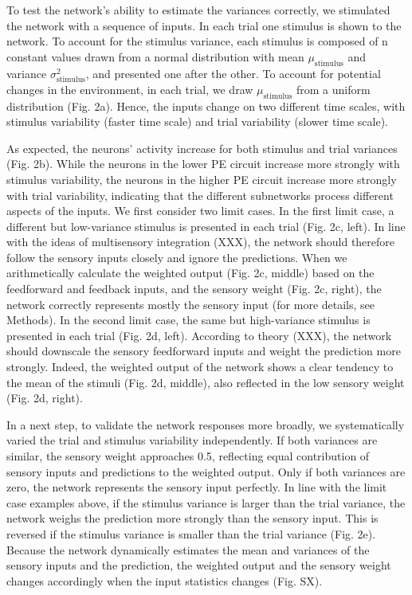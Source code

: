 \documentclass[10pt,a4paper,draft]{article}
\begin{document}
To test the network's ability to estimate the variances correctly, we stimulated the network with a sequence of inputs. In each trial one stimulus is shown to the network. To account for the stimulus variance, each stimulus is composed of n constant values drawn from a normal distribution with mean $\mu_\mathrm{stimulus}$ and variance $\sigma_\mathrm{stimulus}^2$, and presented one after the other. To account for potential changes in the environment, in each trial, we draw $\mu_\mathrm{stimulus}$ from a uniform distribution (Fig. 2a). Hence, the inputs change on two different time scales, with stimulus variability (faster time scale) and trial variability (slower time scale).

As expected, the neurons' activity increase for both stimulus and trial variances (Fig. 2b). While the neurons in the lower PE circuit increase more strongly with stimulus variability, the neurons in the higher PE circuit increase more strongly with trial variability, indicating that the different subnetworks process different aspects of the inputs. We first consider two limit cases. In the first limit case, a different but low-variance stimulus is presented in each trial (Fig. 2c, left). In line with the ideas of multisensory integration (XXX), the network should therefore follow the sensory inputs closely and ignore the predictions. When we arithmetically calculate the weighted output (Fig. 2c, middle) based on the feedforward and feedback inputs, and the sensory weight (Fig. 2c, right), the network correctly represents mostly the sensory input (for more details, see Methods). In the second limit case, the same but high-variance stimulus is presented in each trial (Fig. 2d, left). According to theory (XXX), the network should downscale the sensory feedforward inputs and weight the prediction more strongly. Indeed, the weighted output of the network shows a clear tendency to the mean of the stimuli (Fig. 2d, middle), also reflected in the low sensory weight (Fig. 2d, right). 

In a next step, to validate the network responses more broadly, we systematically varied the trial and stimulus variability independently. If both variances are similar, the sensory weight approaches 0.5, reflecting equal contribution of sensory inputs and predictions to the weighted output. Only if both variances are zero, the network represents the sensory input perfectly. In line with the limit case examples above, if the stimulus variance is larger than the trial variance, the network weighs the prediction more strongly than the sensory input. This is reversed if the stimulus variance is smaller than the trial variance (Fig. 2e). Because the network dynamically estimates the mean and variances of the sensory inputs and the prediction, the weighted output and the sensory weight changes accordingly when the input statistics changes (Fig. SX). 
\end{document}
